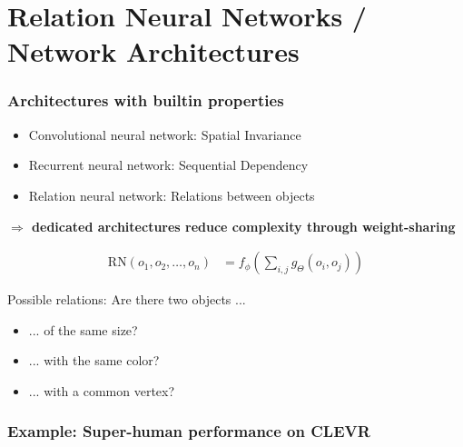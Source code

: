 \section[rel]{Relation Neural Networks / Network Architectures}

\begin{frame}
\frametitle{Architectures with builtin properties}
\begin{itemize}
\item Convolutional neural network: Spatial Invariance
\item Recurrent neural network: Sequential Dependency
\item Relation neural network: Relations between objects
\end{itemize}
\textbf{$\Rightarrow$ dedicated architectures reduce complexity through weight-sharing}

\vspace{-1em}
\begin{align*}
\mathrm{RN}(o_1, o_2, \dots, o_n) &= f_\phi \left( \sum_{i,j} g_\Theta(o_i, o_j) \right)
\end{align*}

Possible relations: Are there two objects ...
\begin{itemize}
\item ... of the same size?
\item ... with the same color?
\item ... with a common vertex?
\end{itemize}

\end{frame}

\begin{frame}
\frametitle{Example: Super-human performance on CLEVR}
\begin{center}
\vspace{-0.5em}
      \end{center}
\end{frame}
